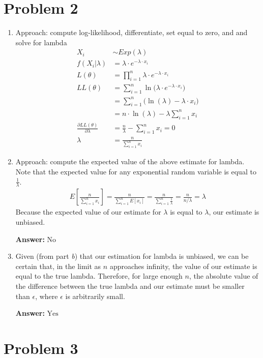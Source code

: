 \documentclass[12pt]{article}
\newcommand{\answer}[1]{\textbf{Answer:} $\boxed{#1}$}
\newcommand{\pd}{\\[2pt]}
\begin{document}
      \newpage
      \section*{Problem 2}
         \begin{enumerate}
            \item
               Approach: compute log-likelihood, differentiate, set
               equal to zero, and and solve for lambda
               \begin{align*}
                  X_i &\sim Exp(\lambda) \pd
                  f(X_i | \lambda) &= \lambda \cdot e^{-\lambda \cdot x_i} \pd
                  L(\theta) &=
                     \prod_{i = 1}^{n} \lambda \cdot e^{-\lambda \cdot x_i} \pd
                  LL(\theta) &= \sum_{i = 1}^{n}
                     \ln \big(\lambda \cdot e^{-\lambda \cdot x_i}\big) \pd
                  &= \sum_{i = 1}^{n} \big(\ln(\lambda) - \lambda \cdot x_i) \pd
                  &= n \cdot \ln(\lambda) - \lambda \sum_{i=1}^n{x_i} \pd
                  \frac{\partial LL(\theta)}{\partial \lambda} &=
                     \frac{n}{\lambda} - \sum_{i = 1}^{n}{x_i} = 0 \pd
                  \lambda &= \frac{n}{\sum_{i=1}^{n}{x_i}}
               \end{align*}
            \item
               Approach: compute the expected value of the above estimate for
               lambda. Note that the expected value for any exponential random
               variable is equal to $\frac{1}{\lambda}$.
               \begin{align*}
                  E\left[\frac{n}{\sum_{i=1}^{n}{x_i}}\right] =
                     \frac{n}{\sum\limits_{i=1}^{n}{E[x_i]}}
                  = \frac{n}{\sum\limits_{i=1}^{n}{\frac{1}{\lambda}}}
                  = \frac{n}{n/\lambda}
                  = \lambda
               \end{align*}
               Because the expected value of our estimate for $\lambda$ is equal
               to $\lambda$, our estimate is unbiased.

               \answer{\text{No}}
            \item
               Given (from part \emph{b}) that our estimation for lambda is
               unbiased, we can be certain that, in the limit as $n$ approaches
               infinity, the value of our estimate is equal to the true
               lambda. Therefore, for large enough $n$, the absolute value of
               the difference between the true lambda and our estimate must be
               smaller than $\epsilon$, where $\epsilon$ is arbitrarily small.

               \answer{\text{Yes}}
         \end{enumerate}

      \newpage
      \section*{Problem 3}
\end{document}
